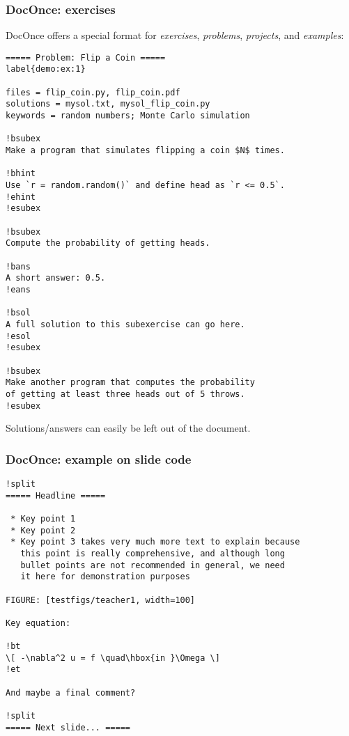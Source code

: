 \documentclass{beamer}
\begin{document}
\begin{frame}
\frametitle{DocOnce: exercises}

DocOnce offers a special format for \emph{exercises}, \emph{problems}, \emph{projects},
and \emph{examples}:

































\begin{Verbatim}[numbers=none,fontsize=\fontsize{9pt}{9pt},baselinestretch=0.95]
===== Problem: Flip a Coin =====
label{demo:ex:1}

files = flip_coin.py, flip_coin.pdf
solutions = mysol.txt, mysol_flip_coin.py
keywords = random numbers; Monte Carlo simulation

!bsubex
Make a program that simulates flipping a coin $N$ times.

!bhint
Use `r = random.random()` and define head as `r <= 0.5`.
!ehint
!esubex

!bsubex
Compute the probability of getting heads.

!bans
A short answer: 0.5.
!eans

!bsol
A full solution to this subexercise can go here.
!esol
!esubex

!bsubex
Make another program that computes the probability
of getting at least three heads out of 5 throws.
!esubex

\end{Verbatim}


Solutions/answers can easily be left out of the document.
\end{frame}

\begin{frame}
\frametitle{DocOnce: example on slide code}

\begin{Verbatim}[numbers=none,fontsize=\fontsize{9pt}{9pt},baselinestretch=0.95]
!split
===== Headline =====

 * Key point 1
 * Key point 2
 * Key point 3 takes very much more text to explain because
   this point is really comprehensive, and although long
   bullet points are not recommended in general, we need
   it here for demonstration purposes

FIGURE: [testfigs/teacher1, width=100]

Key equation:

!bt
\[ -\nabla^2 u = f \quad\hbox{in }\Omega \]
!et

And maybe a final comment?

!split
===== Next slide... =====

\end{Verbatim}
\end{frame}
\end{document}

